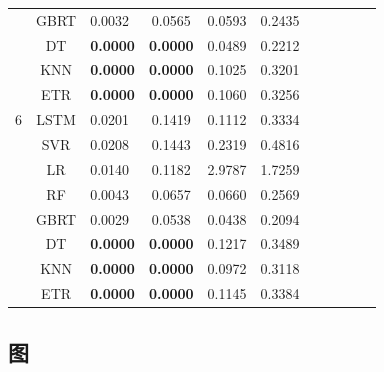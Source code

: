 {\begin{longtable}{cclcccccccc}
   & GBRT & 0.0032 & 0.0565 & 0.0593 & 0.2435  \\
   & DT & \textbf{0.0000} & \textbf{0.0000} & 0.0489 & 0.2212 \\
   & KNN & \textbf{0.0000} & \textbf{0.0000} & 0.1025 & 0.3201 \\
   & ETR & \textbf{0.0000} & \textbf{0.0000} & 0.1060 & 0.3256 \\
  \hline
  6 & LSTM & 0.0201 & 0.1419 & 0.1112 & 0.3334 \\
   & SVR & 0.0208 & 0.1443 & 0.2319 & 0.4816 \\
   & LR & 0.0140 & 0.1182 & 2.9787 & 1.7259 \\
   & RF & 0.0043 & 0.0657 & 0.0660 & 0.2569 \\
   & GBRT & 0.0029 & 0.0538 & 0.0438 & 0.2094 \\
   & DT & \textbf{0.0000} & \textbf{0.0000} & 0.1217 & 0.3489 \\
   & KNN & \textbf{0.0000} & \textbf{0.0000} & 0.0972 & 0.3118 \\
   & ETR & \textbf{0.0000} & \textbf{0.0000} & 0.1145 & 0.3384 \\
\end{longtable}
}

\subsection{图}\label{sec:seis_figure}

